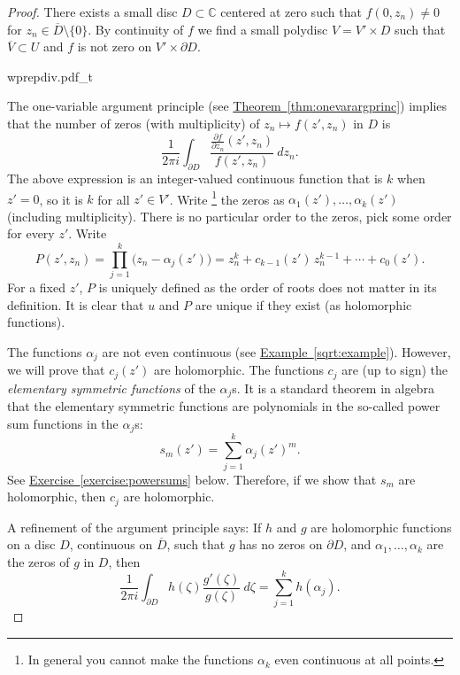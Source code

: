 \documentclass[12pt,openany]{book}
\newcommand{\C}{{\mathbb{C}}}
\theoremstyle{plain}
\theoremstyle{remark}
\theoremstyle{definition}
\newenvironment{myfig}{%
    \begin{center}
}{%
    \end{center}
}
\theoremstyle{exercise}
\theoremstyle{example}
\newcommand{\exerciseref}[1]{\hyperref[#1]{Exercise~\ref*{#1}}}
\newcommand{\exampleref}[1]{\hyperref[#1]{Example~\ref*{#1}}}
\newcommand{\thmref}[1]{\hyperref[#1]{Theorem~\ref*{#1}}}
\begin{document}
\begin{proof}
There exists a small disc $D \subset \C$ centered at zero such that
$f(0,z_n) \not= 0$ for $z_n \in \overline{D} \setminus \{ 0 \}$.
By continuity
of $f$ we find a small polydisc $V = V' \times D$ such that
$\overline{V} \subset U$ and $f$ is not zero on
$V' \times \partial D$.

\begin{myfig}
{wprepdiv.pdf_t}
\end{myfig}

The one-variable argument principle (see \thmref{thm:onevarargprinc}) implies that the number of zeros (with
multiplicity) of $z_n
\mapsto f(z',z_n)$ in $D$ is
\begin{equation*}
\frac{1}{2\pi i}
\int_{\partial D}
\frac{\frac{\partial f}{\partial z_n} (z',z_n)}{f(z',z_n)} ~dz_n .
\end{equation*}
The above expression is an integer-valued
continuous function that is $k$ when $z'=0$,
so it is $k$ for all $z' \in V'$.
Write%
\footnote{In general you cannot make the
functions $\alpha_k$ even continuous at all points.}
the zeros as $\alpha_1(z'),\ldots,\alpha_k(z')$ (including
multiplicity).  There is no particular order to the zeros,
pick some order for every $z'$.
Write
\begin{equation*}
P(z',z_n)
=
\prod_{j=1}^k \bigl(z_n-\alpha_j(z')\bigr)
=
z_n^k + c_{k-1}(z') \, z_n^{k-1} + \cdots + c_0 (z') .
\end{equation*}
For a fixed $z'$, $P$ is uniquely defined as the order of roots does not
matter in its definition.  It is
clear that
$u$ and $P$ are unique if they exist (as holomorphic functions).

The functions $\alpha_j$ are not even continuous (see
\exampleref{sqrt:example}).  However,
we will prove that $c_j(z')$ are holomorphic.  The functions $c_j$ are
(up to sign)
the \emph{elementary symmetric functions}
of the $\alpha_j$s.  It is a standard
theorem in algebra that the elementary symmetric functions are
polynomials in the so-called power sum functions in the $\alpha_j$s:
\begin{equation*}
s_m(z') = \sum_{j=1}^k \alpha_j{(z')}^m .
\end{equation*}
See \exerciseref{exercise:powersums} below.
Therefore, if we show that $s_m$ are holomorphic, then $c_j$ are 
holomorphic.

A refinement of the argument principle says:
If $h$ and $g$ are
holomorphic functions on a disc $D$, continuous on $\overline{D}$,
such that $g$ has no zeros on $\partial D$, and $\alpha_1,\ldots,\alpha_k$
are the zeros of $g$ in $D$, then
\begin{equation*}
\frac{1}{2 \pi i}
\int_{\partial D} h(\zeta) \frac{g'(\zeta)}{g(\zeta)} ~d\zeta
= \sum_{j=1}^k h(\alpha_j) .
\end{equation*}


\end{proof}
\end{document}
